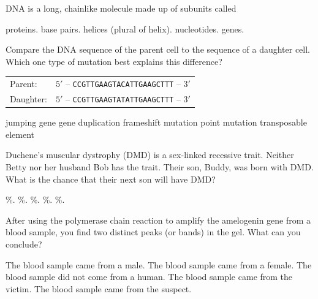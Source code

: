\question
DNA is a long, chainlike molecule made up of subunits called

\begin{choices}
\choice proteins.%
\choice base pairs.%
\choice helices (plural of helix).%
\correctchoice nucleotides.%
\choice genes.%
\end{choices}

\question
Compare the DNA sequence of the parent cell to the sequence of a daughter cell.  Which one type of mutation best explains this difference?

\vspace{0.4\baselineskip}
\begin{tabular}{@{}ll@{}}
Parent: & $5'$ -- \texttt{CCGTTGAAGTACATTGAAGCTTT} -- $3'$\\
Daughter: & $5'$ -- \texttt{CCGTTGAAGTATATTGAAGCTTT} -- $3'$\\
\end{tabular}

\begin{choices}
\choice jumping gene%
\choice gene duplication%
\choice frameshift mutation%
\correctchoice point mutation%
\choice transposable element%
\end{choices}


\question
Duchene's muscular dystrophy (DMD) is a sex-linked recessive trait. Neither Betty nor her husband Bob has the trait. Their son, Buddy, was born with DMD. What is the chance that their next son will have DMD?

\begin{choices}
\%.%
\%.%
\%.%
\%.%
\%.%
\end{choices}


\question
After using the polymerase chain reaction to amplify the amelogenin gene from a blood sample, you find two distinct peaks (or bands) in the gel.  What can you conclude?

\begin{choices}
\correctchoice The blood sample came from a male.%
\choice The blood sample came from a female.%
\choice The blood sample did not come from a human.%
\choice The blood sample came from the victim.%
\choice The blood sample came from the suspect.%
\end{choices}

